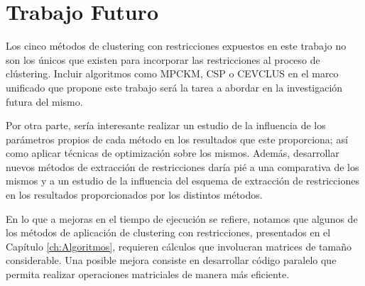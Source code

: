 \section{Trabajo Futuro}

Los cinco métodos de clustering con restricciones expuestos en este trabajo no son los únicos que existen para incorporar las restricciones al proceso de clústering. Incluir algoritmos como \acf{MPCKM}, \acf{CSP} o \acf{CEVCLUS} en el marco unificado que propone este trabajo será la tarea a abordar en la investigación futura del mismo.

Por otra parte, sería interesante realizar un estudio de la influencia de los parámetros propios de cada método en los resultados que este proporciona; así como aplicar técnicas de optimización sobre los mismos. Además, desarrollar nuevos métodos de extracción de restricciones daría pié a una comparativa de los mismos y a un estudio de la influencia del esquema de extracción de restricciones en los resultados proporcionados por los distintos métodos.

En lo que a mejoras en el tiempo de ejecución se refiere, notamos que algunos de los métodos de aplicación de clustering con restricciones, presentados en el Capítulo \ref{ch:Algoritmos}, requieren cálculos que involucran matrices de tamaño considerable. Una posible mejora consiste en desarrollar código paralelo que permita realizar operaciones matriciales de manera más eficiente.